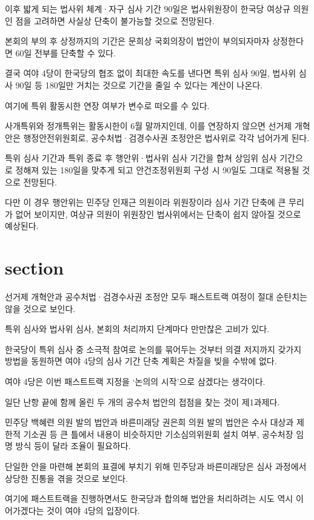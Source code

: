 \documentclass[final,doctor,korean]{konkukreport}
\begin{document}
이후 밟게 되는 법사위 체계·자구 심사 기간 90일은 법사위원장이 한국당 여상규 의원인 점을 고려하면 사실상 단축이 불가능할 것으로 전망된다.

본회의 부의 후 상정까지의 기간은 문희상 국회의장이 법안이 부의되자마자 상정한다면 60일 전부를 단축할 수 있다.

결국 여야 4당이 한국당의 협조 없이 최대한 속도를 낸다면 특위 심사 90일, 법사위 심사 90일 등 180일만 거치는 것으로 기간을 줄일 수 있다는 계산이 나온다.

여기에 특위 활동시한 연장 여부가 변수로 떠오를 수 있다.

사개특위와 정개특위는 활동시한이 6월 말까지인데, 이를 연장하지 않으면 선거제 개혁안은 행정안전위원회로, 공수처법·검경수사권 조정안은 법사위로 각각 넘어가게 된다.

특위 심사 기간과 특위 종료 후 행안위·법사위 심사 기간을 합쳐 상임위 심사 기간으로 정해져 있는 180일을 맞추게 되고 안건조정위원회 구성 시 90일도 그대로 적용될 것으로 전망된다.

다만 이 경우 행안위는 민주당 인재근 의원이라 위원장이라 심사 기간 단축에 큰 무리가 없어 보이지만, 여상규 의원이 위원장인 법사위에서는 단축이 쉽지 않아질 것으로 예상된다.
\section{section}
선거제 개혁안과 공수처법·검경수사권 조정안 모두 패스트트랙 여정이 절대 순탄치는 않을 것으로 보인다.

특위 심사와 법사위 심사, 본회의 처리까지 단계마다 만만찮은 고비가 있다.

한국당이 특위 심사 중 소극적 참여로 논의를 묶어두는 것부터 의결 저지까지 갖가지 방법을 동원하면 여야 4당의 심사 기간 단축 계획은 차질을 빚을 수밖에 없다.

여야 4당은 이번 패스트트랙 지정을 `논의의 시작'으로 삼겠다는 생각이다.

일단 난항 끝에 함께 올린 두 개의 공수처 법안의 접점을 찾는 것이 제1과제다.

민주당 백혜련 의원 발의 법안과 바른미래당 권은희 의원 발의 법안은 수사 대상과 제한적 기소권 등 큰 틀에서 내용이 비슷하지만 기소심의위원회 설치 여부, 공수처장 임명 방식 등이 달라 조율이 필요하다.

단일한 안을 마련해 본회의 표결에 부치기 위해 민주당과 바른미래당은 심사 과정에서 상당한 진통을 겪을 것으로 보인다.

여기에 패스트트랙을 진행하면서도 한국당과 합의해 법안을 처리하려는 시도 역시 이어가겠다는 것이 여야 4당의 입장이다.
\end{document}
